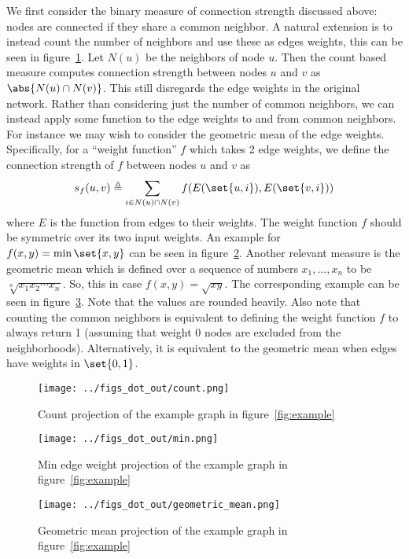 \documentclass{pset}
\begin{document}
We first consider the binary measure of connection strength discussed above:
nodes are connected if they share a common neighbor. A natural extension is to
instead count the number of neighbors and use these as edges weights, this can
be seen in figure~\ref{fig:count}. Let $N(u)$ be the neighbors of node $u$.
Then the count based measure computes connection strength between nodes $u$ and $v$
as $\abs{N(u) \cap N(v)}$. 
This still disregards the edge weights in the original network. 
Rather than considering just the number of common neighbors,
we can instead apply some function to the edge weights to and from common neighbors.
For instance we may wish to consider the geometric mean of the edge weights.
Specifically, for a ``weight function'' $f$ which takes 2 edge weights,
we define the connection strength of $f$ between nodes $u$ and $v$ as
\[s_f(u, v) \triangleq \sum_{i \in N(u) \cap N(v)} f(E(\set{u, i}), E(\set{v, i}))\]
where $E$ is the function from edges to their weights.
The weight function $f$ should be symmetric over its two input weights.
An example for $f(x, y) = \min\set{x,y}$ can be seen in figure~\ref{fig:min}.
Another relevant measure is the geometric mean which is defined over
a sequence of numbers $x_1,\ldots,x_n$ to be $\sqrt[n]{x_1 x_2 \cdots x_n}$.
So, this in case $f(x, y) = \sqrt{x y}$.
The corresponding example can be seen in figure~\ref{fig:geometric}.
Note that the values are rounded heavily.
Also note that counting the common neighbors is equivalent to
defining the weight function $f$ to always return 1 (assuming that weight 0 nodes are
excluded from the neighborhoods). Alternatively, it is equivalent to the geometric
mean when edges have weights in $\set{0, 1}$.

\begin{figure}[ht]
\centering
\texttt{[image: ../figs\_dot\_out/count.png]}
\caption{Count projection of the example graph in figure~\ref{fig:example}}\label{fig:count}
\end{figure}

\begin{figure}[ht]
\centering
\texttt{[image: ../figs\_dot\_out/min.png]}
\caption{Min edge weight projection of the example graph in figure~\ref{fig:example}}\label{fig:min}
\end{figure}


\begin{figure}[ht]
\centering
\texttt{[image: ../figs\_dot\_out/geometric\_mean.png]}
\caption{Geometric mean projection of the example graph in figure~\ref{fig:example}}\label{fig:geometric}
\end{figure}
\end{document}
